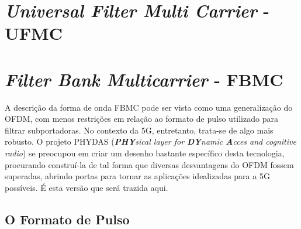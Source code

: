 \chapter{\textit{Universal Filter Multi Carrier} - UFMC} \label{capitulo4}

\chapter{\textit{Filter Bank Multicarrier} - FBMC} \label{capitulo3}




A descrição da forma de onda FBMC pode ser vista como uma generalização do OFDM, com menos restrições em relação ao formato de pulso utilizado para filtrar subportadoras. No contexto da 5G, entretanto, trata-se de algo mais robusto. O projeto PHYDAS (\textit{\textbf{PHY}sical layer for \textbf{DY}namic \textbf{A}cces and cognitive radio}) \cite{phydas} se preocupou em criar um desenho bastante específico desta tecnologia, procurando construí-la de tal forma que diversas desvantagens do OFDM fossem superadas, abrindo portas para tornar as aplicações idealizadas para a 5G possíveis. É esta versão que será trazida aqui. 


\section{O Formato de Pulso}\label{pulso} 

